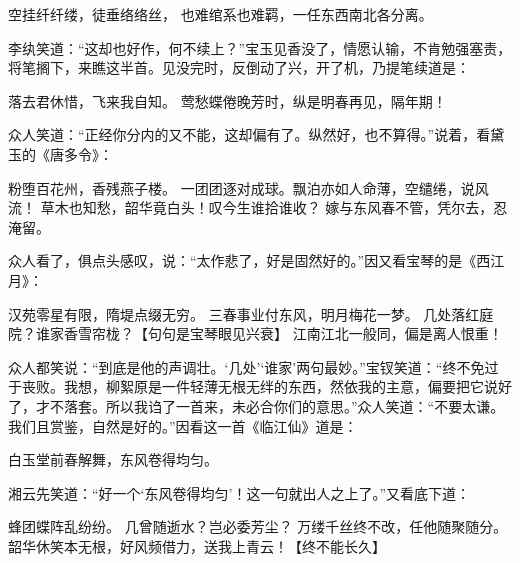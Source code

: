 \documentclass[12pt,oneside]{book}
\begin{document}
空挂纤纤缕，徒垂络络丝，
也难绾系也难羁，一任东西南北各分离。

李纨笑道：“这却也好作，何不续上？”宝玉见香没了，情愿认输，不肯勉强塞责，将笔搁下，来瞧这半首。见没完时，反倒动了兴，开了机，乃提笔续道是：

落去君休惜，飞来我自知。
莺愁蝶倦晚芳时，纵是明春再见，隔年期！

众人笑道：“正经你分内的又不能，这却偏有了。纵然好，也不算得。”说着，看黛玉的《唐多令》：

粉堕百花州，香残燕子楼。
一团团逐对成球。飘泊亦如人命薄，空缱绻，说风流！
草木也知愁，韶华竟白头！叹今生谁拾谁收？
嫁与东风春不管，凭尔去，忍淹留。

众人看了，俱点头感叹，说：“太作悲了，好是固然好的。”因又看宝琴的是《西江月》：

汉苑零星有限，隋堤点缀无穷。
三春事业付东风，明月梅花一梦。
几处落红庭院？谁家香雪帘栊？【句句是宝琴眼见兴衰】
江南江北一般同，偏是离人恨重！

众人都笑说：“到底是他的声调壮。‘几处’‘谁家’两句最妙。”宝钗笑道：“终不免过于丧败。我想，柳絮原是一件轻薄无根无绊的东西，然依我的主意，偏要把它说好了，才不落套。所以我诌了一首来，未必合你们的意思。”众人笑道：“不要太谦。我们且赏鉴，自然是好的。”因看这一首《临江仙》道是：

白玉堂前春解舞，东风卷得均匀。

湘云先笑道：“好一个‘东风卷得均匀’！这一句就出人之上了。”又看底下道：

蜂团蝶阵乱纷纷。
几曾随逝水？岂必委芳尘？
万缕千丝终不改，任他随聚随分。
韶华休笑本无根，好风频借力，送我上青云！【终不能长久】
\end{document}
